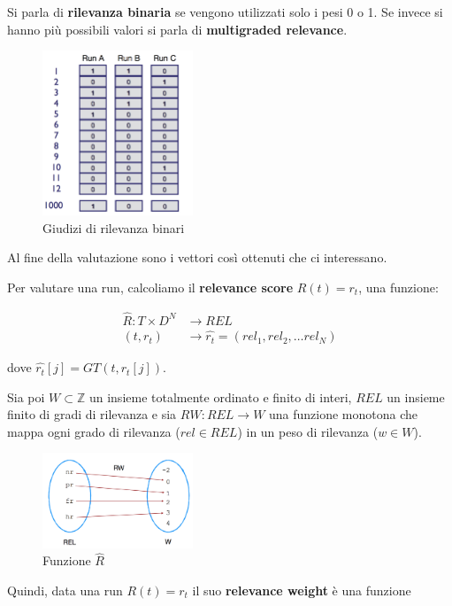 Si parla di \textbf{rilevanza binaria} se vengono utilizzati solo i pesi 0 o 1.
Se invece si hanno più possibili valori si parla di \textbf{multigraded relevance}.

\begin{figure}[htbp]
	\centering
	\includegraphics[width=0.4\textwidth]{images/l14-fig-7.png}
	\caption{Giudizi di rilevanza binari}
\end{figure}

Al fine della valutazione sono i vettori così ottenuti che ci interessano.

Per valutare una run, calcoliamo il \textbf{relevance score} $R(t) = r_t$, una funzione:

\begin{align*}
	\hat{R} : T \times D^N &\to REL \\
	(t,r_t) &\to \hat{r_t} = (rel_1, rel_2, \ldots rel_N)
\end{align*}

\noindent dove $\hat{r_t}[j] = GT(t, r_t[j])$.

Sia poi $W \subset \mathbb{Z}$ un insieme totalmente ordinato e finito di interi, $REL$ un insieme finito di gradi di rilevanza e sia $RW: REL \to W$ una funzione monotona che mappa ogni grado di rilevanza ($rel \in REL$) in un peso di rilevanza ($w \in W$).

\begin{figure}[htbp]
	\centering
	\includegraphics[width=0.4\textwidth]{images/l14-fig-8.png}
	\caption{Funzione $\hat{R}$}
\end{figure}

\noindent Quindi, data una run $R(t) = r_t$ il suo \textbf{relevance weight} è una funzione

